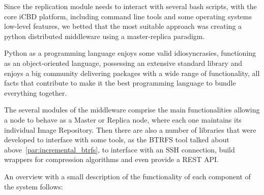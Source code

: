 Since the replication module needs to interact with several bash scripts, with the core iCBD platform, including command line tools and some operating systems low-level features, we betted that the most suitable approach was creating a python distributed middleware using a master-replica paradigm.

Python as a programming language enjoys some valid idiosyncrasies, functioning as an object-oriented language, possessing an extensive standard library and enjoys a big community delivering packages with a wide range of functionality, all facts that contribute to make it the best programming language to bundle everything together.

The several modules of the middleware comprise the main functionalities allowing a node to behave as a Master or Replica node, where each one maintains its individual Image Repository. Then there are also a number of libraries that were developed to interface with some tools, as the BTRFS tool talked about above~\ref{par:incremental_btrfs}, to interface with an SSH connection, build wrappers for compression algorithms and even provide a REST API.

An overview with a small description of the functionality of each component of the system follows:


